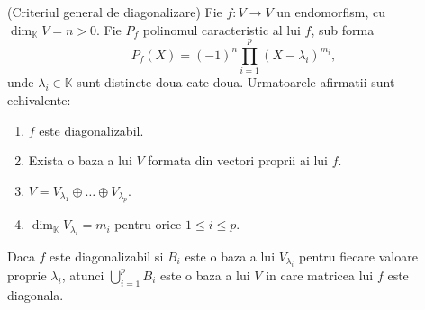 \documentclass{article}
\begin{document}
\begin{enumerate}
  \begin{tcolorbox}
    \teorema (Criteriul general de diagonalizare) Fie $f : V\to V$ un endomorfism, cu $\dim_{\mathbb K} V=n>0$. Fie $P_f$ polinomul caracteristic al lui $f$, sub forma
    \[
      P_f(X)=(-1)^n\prod_{i=1}^p(X-\lambda_i)^{m_i},
    \]
    unde $\lambda_i\in\mathbb K$ sunt distincte doua cate doua. Urmatoarele afirmatii sunt echivalente:
    \begin{enumerate}
      \item $f$ este diagonalizabil.
      \item Exista o baza a lui $V$ formata din vectori proprii ai lui $f$.
      \item $V=V_{\lambda_1}\oplus\dots\oplus V_{\lambda_p}$.
      \item $\dim_{\mathbb K}V_{\lambda_i}=m_i$ pentru orice $1\leq i\leq p$.
    \end{enumerate}
  \end{tcolorbox}

  \corolar Daca $f$ este diagonalizabil si $B_i$ este o baza a lui $V_{\lambda_i}$ pentru fiecare valoare proprie $\lambda_i$, atunci $\bigcup_{i=1}^p B_i$ este o baza a lui $V$ in care matricea lui $f$ este diagonala.

\end{enumerate}
\end{document}
